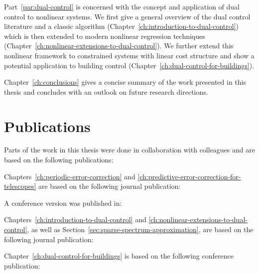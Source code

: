 Part~\ref{par:dual-control} is concerned with the concept and application of
dual control to nonlinear systems. We first give a general overview of the dual
control literature and a classic algorithm
(Chapter~\ref{ch:introduction-to-dual-control}) which is then extended
to modern nonlinear regression techniques
(Chapter~\ref{ch:nonlinear-extensions-to-dual-control}). We further extend this
nonlinear framework to constrained systems with linear cost structure
and show a potential application to building control
(Chapter~\ref{ch:dual-control-for-buildings}).

Chapter~\ref{ch:conclusions} gives a concise summary of the work
presented in this thesis and concludes with an outlook on future research
directions.

\section*{Publications}

{\setlength{\parindent}{0pt}

Parts of the work in this thesis were done in collaboration with colleagues
and are based on the following publications:

\vspace{5mm}

Chapters~\ref{ch:periodic-error-correction} and
\ref{ch:predictive-error-correction-for-telescopes} are based on the
following journal publication:


A conference version was published in:


Chapters~\ref{ch:introduction-to-dual-control} and
\ref{ch:nonlinear-extensions-to-dual-control}, as well as
Section~\ref{sec:sparse-spectrum-approximation}, are based on the following
journal publication:


Chapter~\ref{ch:dual-control-for-buildings} is based on the following conference
publication:

}
